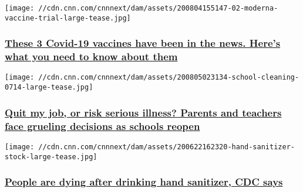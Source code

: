 \href{/2020/08/06/health/covid-19-vaccines-explainer/index.html}{}

\texttt{[image: //cdn.cnn.com/cnnnext/dam/assets/200804155147-02-moderna-vaccine-trial-large-tease.jpg]}

\hypertarget{these-3-covid-19-vaccines-have-been-in-the-news-heres-what-you-need-to-know-about-them}{%
\subsubsection{\texorpdfstring{\href{/2020/08/06/health/covid-19-vaccines-explainer/index.html}{These
3 Covid-19 vaccines have been in the news. Here's what you need to know
about
them}}{These 3 Covid-19 vaccines have been in the news. Here's what you need to know about them}}\label{these-3-covid-19-vaccines-have-been-in-the-news-heres-what-you-need-to-know-about-them}}

\href{/2020/08/05/health/us-coronavirus-wednesday/index.html}{}

\texttt{[image: //cdn.cnn.com/cnnnext/dam/assets/200805023134-school-cleaning-0714-large-tease.jpg]}

\hypertarget{quit-my-job-or-risk-serious-illness-parents-and-teachers-face-grueling-decisions-as-schools-reopen-}{%
\subsubsection{\texorpdfstring{\href{/2020/08/05/health/us-coronavirus-wednesday/index.html}{Quit
my job, or risk serious illness? Parents and teachers face grueling
decisions as schools reopen
}}{Quit my job, or risk serious illness? Parents and teachers face grueling decisions as schools reopen }}\label{quit-my-job-or-risk-serious-illness-parents-and-teachers-face-grueling-decisions-as-schools-reopen-}}

\href{/2020/08/05/health/hand-sanitizer-cdc-warning-study-wellness/index.html}{}

\texttt{[image: //cdn.cnn.com/cnnnext/dam/assets/200622162320-hand-sanitizer-stock-large-tease.jpg]}

\hypertarget{people-are-dying-after-drinking-hand-sanitizer-cdc-says}{%
\subsubsection{\texorpdfstring{\href{/2020/08/05/health/hand-sanitizer-cdc-warning-study-wellness/index.html}{People
are dying after drinking hand sanitizer, CDC
says}}{People are dying after drinking hand sanitizer, CDC says}}\label{people-are-dying-after-drinking-hand-sanitizer-cdc-says}}

